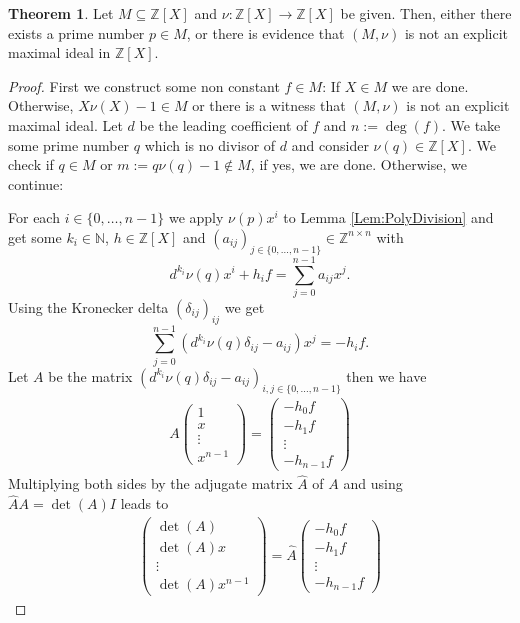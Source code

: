 \documentclass[10pt,a4paper]{article}
\theoremstyle{definition}
\newtheorem{theorem}{Theorem}
\newcommand{\NN}{\mathbb{N}}
\newcommand{\ZZ}{\mathbb{Z}}
\newcommand{\ZX}{\mathbb{Z}[X]}
\begin{document}
\begin{theorem}
Let $M\subseteq \ZZ[X]$ and $\nu: \ZZ[X]\to \ZZ[X]$ be given. Then, either there exists a prime number $p\in M$, or there is evidence that $(M,\nu)$ is not an explicit maximal ideal in $\ZZ[X]$.
\end{theorem}
\begin{proof}
First we construct some non constant $f\in M$: If $X\in M$ we are done. Otherwise, $X\nu(X)-1\in M$ or there is a witness that  $(M,\nu)$ is not an explicit maximal ideal.
Let $d$ be the leading coefficient of $f$ and $n:=\deg(f)$. We take some prime number $q$ which is no divisor of $d$ and consider $\nu(q)\in \ZX$. We check if $q\in M$ or $m:=q\nu(q)-1\notin M$, if yes, we are done. Otherwise, we continue:

 For each $i\in\{0,\dots, n-1\}$ we apply $\nu(p)x^i$ to Lemma \ref{Lem:PolyDivision} and get some $k_i\in\NN$, $h\in \ZX$ and $(a_{ij})_{j\in\{0,\dots,n-1\}}\in \ZZ^{n\times n}$ with
$$d^{k_i}\nu(q)x^i + h_if = \sum_{j=0}^{n-1}a_{ij}x^j.$$
Using the Kronecker delta $(\delta_{ij})_{ij}$ we get
$$\sum_{j=0}^{n-1}(d^{k_i}\nu(q)\delta_{ij}-a_{ij})x^j = -h_if.$$
Let $A$ be the matrix $(d^{k_i}\nu(q)\delta_{ij}-a_{ij})_{i,j\in\{0,\dots,n-1\}}$ then we have 
\begin{align*}
A \begin{pmatrix}
1\\ x\\ \vdots \\ x^{n-1}
\end{pmatrix} = \begin{pmatrix}
-h_0f\\ -h_1f\\ \vdots \\ -h_{n-1}f
\end{pmatrix}
\end{align*}
Multiplying both sides by the adjugate matrix $\hat{A}$ of $A$ and using $\hat{A}A = \det(A)I$ leads to
\begin{align*}
\begin{pmatrix}
\det(A)\\ \det(A)x\\ \vdots \\ \det(A)x^{n-1}
\end{pmatrix} = \hat{A}\begin{pmatrix}
-h_0f\\ -h_1f\\ \vdots \\ -h_{n-1}f
\end{pmatrix}

\end{align*}
\end{proof}
\end{document}
